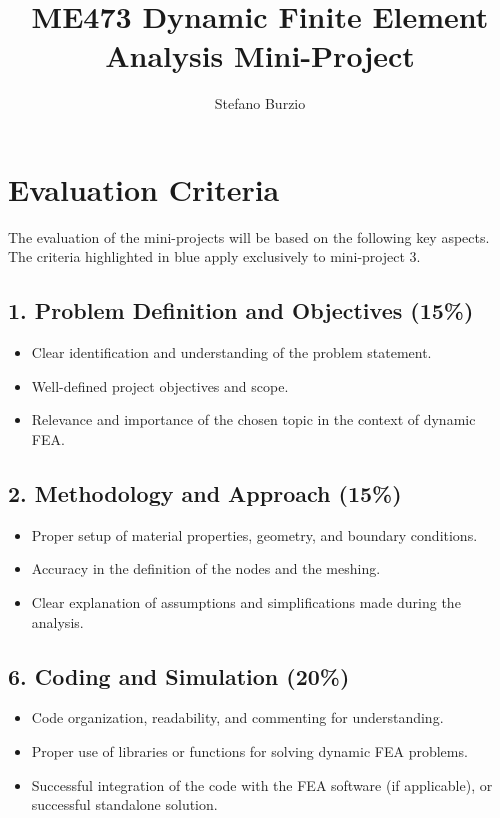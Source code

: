 \documentclass[a4paper,12pt]{article}
\title{ME473 Dynamic Finite Element Analysis Mini-Project}
\author{Stefano Burzio}
\date{}
\begin{document}
\maketitle

\section*{Evaluation Criteria}

The evaluation of the mini-projects will be based on the following key aspects. The criteria highlighted in blue apply exclusively to mini-project 3.

\subsection*{1. Problem Definition and Objectives (15\%)}
\begin{itemize}
    \item Clear identification and understanding of the problem statement.
    \item {\color{blue} Well-defined project objectives and scope}.
    \item {\color{blue} Relevance and importance of the chosen topic in the context of dynamic FEA.}
\end{itemize}

\subsection*{2. Methodology and Approach (15\%)}
\begin{itemize}
    \item Proper setup of material properties, geometry, and boundary conditions.
    \item Accuracy in the definition of the nodes and the meshing.
    \item Clear explanation of assumptions and simplifications made during the analysis.
\end{itemize}

\subsection*{6. Coding and Simulation (20\%)}
\begin{itemize}
    \item Code organization, readability, and commenting for understanding.
    \item Proper use of libraries or functions for solving dynamic FEA problems.
    \item {\color{blue} Successful integration of the code with the FEA software (if applicable), or successful standalone solution.}
\end{itemize}
\end{document}

